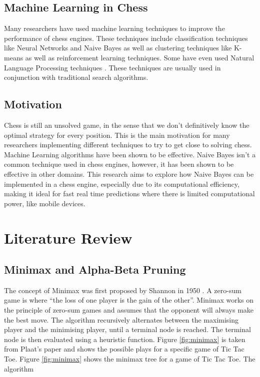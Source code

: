 \documentclass{article}
\begin{document}
\subsection{Machine Learning in Chess}
\label{sec:ml}
Many researchers have used machine learning techniques to improve the performance of chess engines.
These techniques include classification techniques like Neural Networks and Naive Bayes as well as clustering techniques
like K-means as well as reinforcement learning techniques. Some have even used Natural Language Processing techniques
\cite{NLPinChess}. These techniques are usually used in conjunction with traditional search algorithms.

\subsection{Motivation}
\label{sec:motivation}
Chess is still an unsolved game, in the sense that we don't definitively know the optimal strategy for every position.
This is the main motivation for many researchers implementing different techniques to try to get close 
to solving chess. Machine Learning algorithms have been shown to be effective. Naive Bayes isn't a common
technique used in chess engines, however, it has been shown to be effective in other domains. This research
aims to explore how Naive Bayes can be implemented in a chess engine, especially due to its computational
efficiency, making it ideal for fast real time predictions where there is limited computational power, like
mobile devices.

\section{Literature Review}
\label{sec:literature}

\subsection{Minimax and Alpha-Beta Pruning}
\label{sec:minimax}
The concept of Minimax was first proposed by Shannon in 1950 \cite{xieResearchImprovementAlphaBeta2022}.
A zero-sum game is where ``the loss of one player is the gain of the other''\cite{plaatResearchReSearch2024}.
Minimax works on the principle of zero-sum games and assumes that the opponent will always make the 
best move. The algorithm recursively alternates between the maximising player and the minimising player,
until a terminal node is reached. The terminal node is then evaluated using a heuristic function. Figure \ref{fig:minimax}
is taken from Plaat's paper \cite{plaatResearchReSearch2024} and shows the possible plays for a specific game
of Tic Tac Toe. Figure \ref{fig:minimax} shows the minimax tree for a game of Tic Tac Toe. The algorithm
\end{document}

